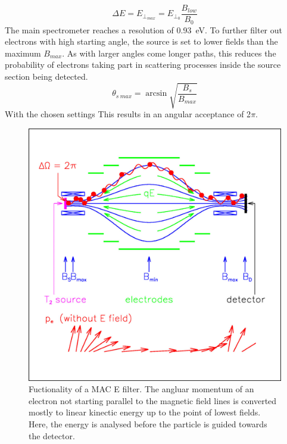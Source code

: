       \begin{equation}
	    \Delta E = E_{\bot_{max}} = E_{\bot_0}\frac{B_{low}}{B_{0}}
      \end{equation}
      The main spectrometer reaches a resolution of \SI{0.93}{\electronvolt}.
      To further filter out electrons with high starting angle, the source is set to lower fields than the maximum $B_{max}$.
      As with larger angles come longer paths, this reduces the probability of electrons taking part in scattering processes inside the source section being detected.
      \begin{equation}
      	\theta_{s~max}= \arcsin{\sqrt{\frac{B_s}{B_{max}}}}
      \end{equation}
      With the chosen settings This results in an angular acceptance of 2$\pi$.
      
            \begin{figure}
	\centering
      	\includegraphics[width = 0.9 \textwidth]{graphics/katrinExperiment/macEFilter.jpg}
      	\caption[MAC E Filter]{Fuctionality of a MAC E filter. The angluar momentum of an electron not starting parallel to the magnetic field lines is converted mostly to linear kinectic energy up to the point of lowest fields. Here, the energy is analysed before the particle is guided towards the detector.}
      	\label{fig:katrinExperiment:tritiumSpectrum}
      \end{figure}
      
